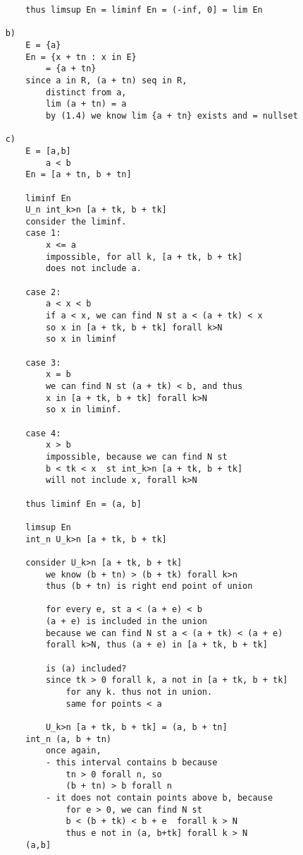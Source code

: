 \documentclass{article}
\begin{document}
\begin{flushleft}
\begin{verbatim}
        thus limsup En = liminf En = (-inf, 0] = lim En 

    b)
        E = {a}
        En = {x + tn : x in E} 
            = {a + tn}
        since a in R, (a + tn) seq in R,
            distinct from a, 
            lim (a + tn) = a
            by (1.4) we know lim {a + tn} exists and = nullset 

    c)
        E = [a,b] 
            a < b
        En = [a + tn, b + tn]

        liminf En 
        U_n int_k>n [a + tk, b + tk]
        consider the liminf.
        case 1:
            x <= a 
            impossible, for all k, [a + tk, b + tk]
            does not include a.

        case 2:
            a < x < b 
            if a < x, we can find N st a < (a + tk) < x 
            so x in [a + tk, b + tk] forall k>N 
            so x in liminf 

        case 3: 
            x = b 
            we can find N st (a + tk) < b, and thus 
            x in [a + tk, b + tk] forall k>N
            so x in liminf.

        case 4: 
            x > b 
            impossible, because we can find N st 
            b < tk < x  st int_k>n [a + tk, b + tk] 
            will not include x, forall k>N  

        thus liminf En = (a, b]

        limsup En 
        int_n U_k>n [a + tk, b + tk]

        consider U_k>n [a + tk, b + tk]
            we know (b + tn) > (b + tk) forall k>n
            thus (b + tn) is right end point of union 

            for every e, st a < (a + e) < b
            (a + e) is included in the union 
            because we can find N st a < (a + tk) < (a + e)
            forall k>N, thus (a + e) in [a + tk, b + tk]

            is (a) included?
            since tk > 0 forall k, a not in [a + tk, b + tk] 
                for any k. thus not in union. 
                same for points < a 

            U_k>n [a + tk, b + tk] = (a, b + tn]
        int_n (a, b + tn)
            once again, 
            - this interval contains b because
                tn > 0 forall n, so  
                (b + tn) > b forall n
            - it does not contain points above b, because 
                for e > 0, we can find N st 
                b < (b + tk) < b + e  forall k > N 
                thus e not in (a, b+tk] forall k > N  
        (a,b]


\end{verbatim}
\end{flushleft}
\end{document}
